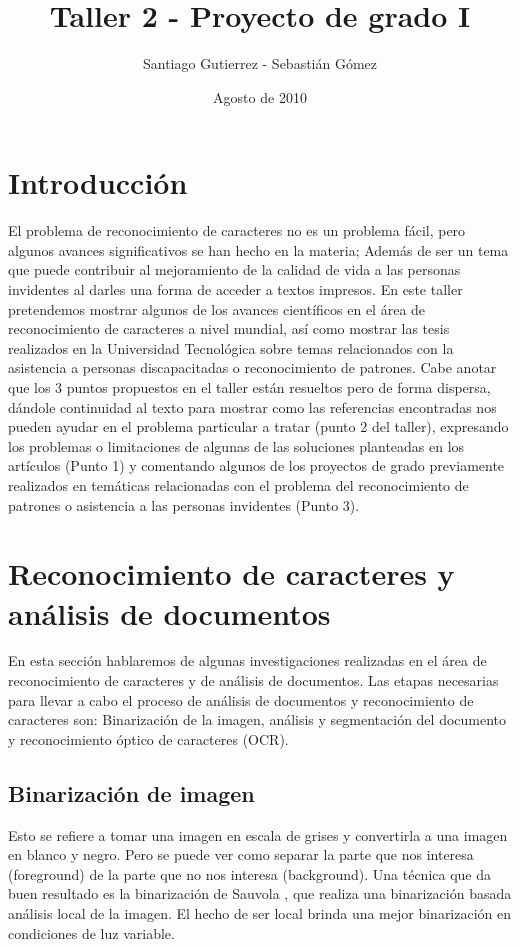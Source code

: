 \documentclass{article}
\begin{document}
\title {Taller 2 - Proyecto de grado I}
\author { Santiago Gutierrez - Sebastián Gómez }
\date {Agosto de 2010}
\maketitle

	\section{Introducción}
	El problema de reconocimiento de caracteres no es un problema fácil, pero algunos
	avances significativos se han hecho en la materia; Además de ser un tema que puede
	contribuir al mejoramiento de la calidad de vida a las personas invidentes al darles
	una forma de acceder a textos impresos.\newline
	En este taller pretendemos mostrar algunos de los avances científicos en el área
	de reconocimiento de caracteres a nivel mundial, así como mostrar las tesis
	realizados en la Universidad Tecnológica sobre temas relacionados con la asistencia
	a personas discapacitadas o reconocimiento de patrones. Cabe anotar que los 3 puntos
	propuestos en el taller están resueltos pero de forma dispersa, dándole continuidad
	al texto para mostrar como las referencias encontradas nos pueden ayudar en el
	problema particular a tratar (punto 2 del taller), expresando los problemas o
	limitaciones de algunas de las soluciones planteadas en los artículos (Punto 1) y
	comentando algunos de los proyectos de grado previamente realizados en temáticas
	relacionadas con el problema del reconocimiento de patrones o asistencia a las
	personas invidentes (Punto 3).
	
	\section{Reconocimiento de caracteres y análisis de documentos}
	En esta sección hablaremos de algunas investigaciones realizadas en el área
	de reconocimiento de caracteres y de análisis de documentos.
	Las etapas necesarias para llevar a cabo el proceso de análisis de documentos
	y reconocimiento de caracteres son: Binarización de la imagen, análisis y
	segmentación del documento y reconocimiento óptico de caracteres (OCR).
	
	\subsection{Binarización de imagen}
	Esto se refiere a tomar una imagen en escala de grises y convertirla a una 
	imagen en blanco y negro. Pero se puede ver como separar la parte que nos interesa
	(foreground) de la parte que no nos interesa (background).
	Una técnica que da buen resultado es la binarización de Sauvola \cite{ocropus2},
	que realiza una binarización basada análisis local de la imagen. El hecho de
	ser local brinda una mejor binarización en condiciones de luz variable.
	
\end{document}
